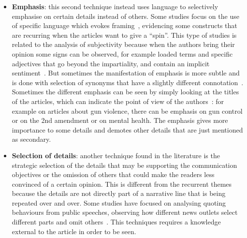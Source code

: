 \begin{itemize}
    \item \textbf{Emphasis}: this second technique instead uses language to selectively emphasise on certain details instead of others.
    Some studies focus on the use of specific language which evokes framing~\cite{baumer2015testing}, evidencing some constructs that are recurring when the articles want to give a ``spin''.
    This type of studies is related to the analysis of subjectivity because when the authors bring their opinion some signs can be observed, for example loaded terms and specific adjectives that go beyond the impartiality, and contain an implicit sentiment~\cite{greene2009more}.
    But sometimes the manifestation of emphasis is more subtle and is done with selection of synonyms that have a slightly different connotation~\cite{schuldt2011global,rugg1941experiments,tversky1981framing}.
    Sometimes the different emphasis can be seen by simply looking at the titles of the articles, which can indicate the point of
    view of the authors~\cite{liu2019detecting}: for example on articles about gun violence, there can be emphasis on gun control or on the 2nd amendment or on mental health.
    The emphasis gives more importance to some details and demotes other details that are just mentioned as secondary.
    
    
    \item \textbf{Selection of details}: another technique found in the literature is the strategic selection of the details that may be supporting the communication objectives or the omission of others that could make the readers less convinced of a certain opinion. This is different from the recurrent themes because the details are not directly part of a narrative line that is being repeated over and over.
    Some studies have focused on analysing quoting behaviours from public speeches, observing how different news outlets select different parts and omit others~\cite{niculae2015quotus}.
    This techniques requires a knowledge external to the article in order to be seen.


\end{itemize}
